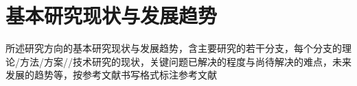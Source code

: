 \section{基本研究现状与发展趋势}

所述研究方向的基本研究现状与发展趋势，含主要研究的若干分支，每个分支的理论/方法/方案//技术研究的现状，关键问题已解决的程度与尚待解决的难点，未来发展的趋势等，按参考文献书写格式标注参考文献\cite{JSJY20260928003}